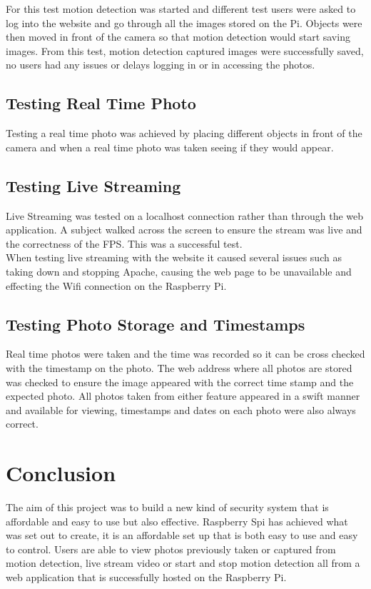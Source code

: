 \documentclass[12pt]{report}
\begin{document}
For this test motion detection was started and different test users were asked to log into the website and go through all the images stored on the Pi. Objects were then moved in front of the camera so that motion detection would start saving images. From this test, motion detection captured images were successfully saved, no users had any issues or delays logging in or in accessing the photos.\\

\section{Testing Real Time Photo}
\label{sec:realPhotoTest}
%

Testing a real time photo was achieved by placing different objects in front of the camera and when a real time photo was taken seeing if they would appear.\\


\section{Testing Live Streaming}
\label{sec:liveStreamTest}
%
Live Streaming was tested on a localhost connection rather than through the web application. A subject walked across the screen to ensure the stream was live and the correctness of the FPS. This was a successful test.\\
 
When testing live streaming with the website it caused several issues such as taking down and stopping Apache, causing the web page to be unavailable and effecting the Wifi connection on the Raspberry Pi.

\section{Testing Photo Storage and Timestamps}
\label{sec:photoStorageTest}
%

Real time photos were taken and the time was recorded so it can be cross checked with the timestamp on the photo. The web address where all photos are stored was checked to ensure the image appeared with the correct time stamp and the expected photo. All photos taken from either feature appeared in a swift manner and available for viewing, timestamps and dates on each photo were also always correct.\\


\chapter{Conclusion}
\label{ch:concl}
%
The aim of this project was to build a new kind of security system that is affordable and easy to use but also effective. Raspberry Spi has achieved what was set out to create, it is an affordable set up that is both easy to use and easy to control. Users are able to view photos previously taken or captured from motion detection, live stream video or start and stop motion detection all from a web application that is successfully hosted on the Raspberry Pi. \\
\end{document}
